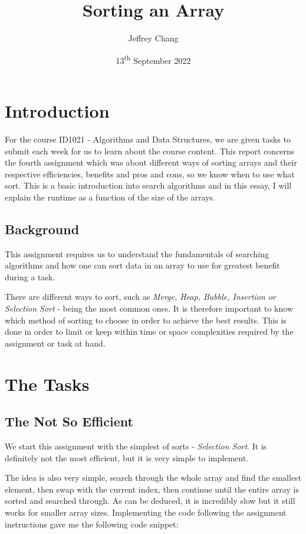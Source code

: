\documentclass[a4paper,11pt]{article}
\begin{document}
\title{
    \textbf{Sorting an Array}
}
\author{Jeffrey Chang}
\date{13\textsuperscript{th} September 2022}

\maketitle

\section*{Introduction}

For the course ID1021 - Algorithms and Data Structures, we are given tasks to submit each week for us to learn about the course content. This report concerns the fourth assignment which was about different ways of sorting arrays and their respective efficiencies, benefits and pros and cons, so we know when to use what sort. This is a basic introduction into search algorithms and in this essay, I will explain the runtime as a function of the size of the arrays.

\subsection*{Background}

This assignment requires us to understand the fundamentals of searching algorithms and how one can sort data in an array to use for greatest benefit during a task. 

There are different ways to sort, such as {\em Merge, Heap, Bubble, Insertion or Selection Sort} - being the most common ones. It is therefore important to know which method of sorting to choose in order to achieve the best results. This is done in order to limit or keep within time or space complexities required by the assignment or task at hand.

\section*{The Tasks}
\subsection*{The Not So Efficient}

We start this assignment with the simplest of sorts - {\em Selection Sort}. It is definitely not the most efficient, but it is very simple to implement. 

The idea is also very simple, search through the whole array and find the smallest element, then swap with the current index, then continue until the entire array is sorted and searched through. As can be deduced, it is incredibly slow but it still works for smaller array sizes. Implementing the code following the assignment instructions gave me the following code snippet:
\end{document}
